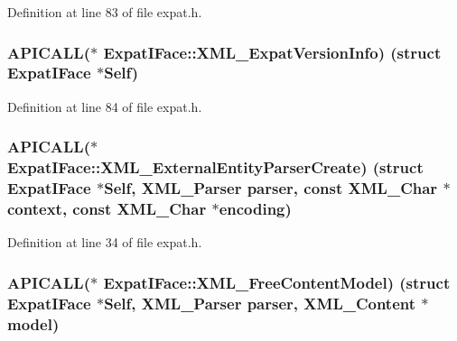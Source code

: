 Definition at line 83 of file expat.\+h.

\subsubsection[{\texorpdfstring{X\+M\+L\+\_\+\+Expat\+Version\+Info}{XML_ExpatVersionInfo}}]{ A\+P\+I\+C\+A\+LL($\ast$ Expat\+I\+Face\+::\+X\+M\+L\+\_\+\+Expat\+Version\+Info) (struct {\bf Expat\+I\+Face} $\ast$Self)}\hypertarget{struct_expat_i_face_ad257fe2441ac77033255c6af38ad31c9}{}\label{struct_expat_i_face_ad257fe2441ac77033255c6af38ad31c9}


Definition at line 84 of file expat.\+h.

\subsubsection[{\texorpdfstring{X\+M\+L\+\_\+\+External\+Entity\+Parser\+Create}{XML_ExternalEntityParserCreate}}]{ A\+P\+I\+C\+A\+LL($\ast$ Expat\+I\+Face\+::\+X\+M\+L\+\_\+\+External\+Entity\+Parser\+Create) (struct {\bf Expat\+I\+Face} $\ast$Self, {\bf X\+M\+L\+\_\+\+Parser} parser, {\bf const} {\bf X\+M\+L\+\_\+\+Char} $\ast${\bf context}, {\bf const} {\bf X\+M\+L\+\_\+\+Char} $\ast${\bf encoding})}\hypertarget{struct_expat_i_face_a70decb450b2bcc775efb0711eb09d8fe}{}\label{struct_expat_i_face_a70decb450b2bcc775efb0711eb09d8fe}


Definition at line 34 of file expat.\+h.

\subsubsection[{\texorpdfstring{X\+M\+L\+\_\+\+Free\+Content\+Model}{XML_FreeContentModel}}]{ A\+P\+I\+C\+A\+LL($\ast$ Expat\+I\+Face\+::\+X\+M\+L\+\_\+\+Free\+Content\+Model) (struct {\bf Expat\+I\+Face} $\ast$Self, {\bf X\+M\+L\+\_\+\+Parser} parser, {\bf X\+M\+L\+\_\+\+Content} $\ast${\bf model})}\hypertarget{struct_expat_i_face_a17d98dcd251d66f8b7ed89256780afc0}{}\label{struct_expat_i_face_a17d98dcd251d66f8b7ed89256780afc0}


